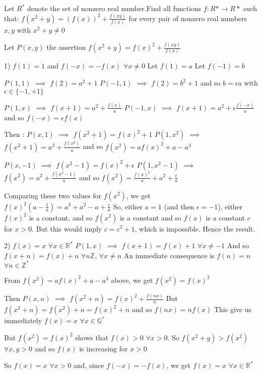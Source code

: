 \begin{solution}
	\begin{tcolorbox}Let $ R^*$ denote the set of nonzero real number.Find all functions $ f: R*\rightarrow R*$ such that:
 $ f(x^2 + y) = (f(x))^2 + \frac {f(xy)}{f(x)}$ for every pair of nonzero real numbers $ x,y$ with $ x^2 + y\not = 0$\end{tcolorbox}

Let $ P(x,y)$ the assertion $ f(x^2+y)=f(x)^2+\frac{f(xy)}{f(x)}$

1) $ f(1)=1$ and $ f(-x)=-f(x)$ $ \forall x\neq 0$
Let $ f(1)=a$
Let $ f(-1)=b$

$ P(1,1)$ $ \implies$ $ f(2)=a^2+1$
$ P(-1,1)$ $ \implies$ $ f(2)=b^2+1$ and so $ b=\epsilon a$ with $ \epsilon\in\{-1,+1\}$

$ P(1,x)$ $ \implies$ $ f(x+1)=a^2+\frac{f(x)}{a}$
$ P(-1,x)$ $ \implies$ $ f(x+1)=a^2+\epsilon\frac{f(-x)}{a}$ and so $ f(-x)=\epsilon f(x)$

Then :
$ P(x,1)$ $ \implies$ $ f(x^2+1)=f(x)^2+1$
$ P(1,x^2)$ $ \implies$ $ f(x^2+1)=a^2+\frac{f(x^2)}{a}$ and so $ f(x^2)=af(x)^2+a-a^3$

$ P(x,-1)$ $ \implies$ $ f(x^2-1)=f(x)^2+\epsilon$
$ P(1,x^2-1)$ $ \implies$ $ f(x^2)=a^2+\frac{f(x^2-1)}{a}$ and so $ f(x^2)=\frac{f(x)^2}{a}+a^2+\frac{\epsilon}{a}$

Comparing these two values for $ f(x^2)$, we get $ f(x)^2(a-\frac 1a)=a^3+a^2-a+\frac{\epsilon}{a}$
So, either $ a=1$ (and then $ \epsilon=-1$), either $ f(x)^2$ is a constant, and so $ f(x^2)$ is a constant and so $ f(x)$ is a constant $ c$ for $ x>0$. But this would imply $ c=c^2+1$, which is impossible.
Hence the result.

2) $ f(x)=x$ $ \forall x\in \mathbb R^*$
$ P(1,x)$ $ \implies$ $ f(x+1)=f(x)+1$ $ \forall x\neq -1$ And so $ f(x+n)=f(x)+n$ $ \forall n\mathbb Z$, $ \forall x\neq n$
An immediate consequence is $ f(n)=n$ $ \forall n\in\mathbb Z^*$

From $ f(x^2)=af(x)^2+a-a^3$ above, we get $ f(x^2)=f(x)^2$

Then $ P(x,n)$ $ \implies$ $ f(x^2+n)=f(x)^2+\frac{f(nx)}{n}$ But $ f(x^2+n)=f(x^2)+n=f(x)^2+n$ and so $ f(nx)=nf(x)$
This give us immediately $ f(x)=x$ $ \forall x\in\mathbb Q^*$

But $ f(x^2)=f(x)^2$ shows that $ f(x)>0$ $ \forall x>0$. So $ f(x^2+y)>f(x^2)$ $ \forall x,y>0$ and so $ f(x)$ is increasing for $ x>0$

So $ f(x)=x$ $ \forall x>0$ and, since $ f(-x)=-f(x)$, we get $ f(x)=x$ $ \forall x\in \mathbb R^*$
\end{solution}



